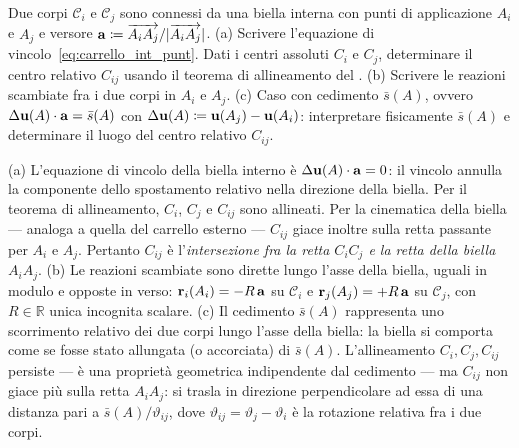 \begin{esercizio}
	\label{ex:C04_pendolo_interno}
	
	Due corpi $\mathcal{C}_i$ e $\mathcal{C}_j$ sono connessi da una biella interna con punti di applicazione $A_i$ e $A_j$ e versore $\mathbf{a} \coloneqq \overrightarrow{A_iA_j}/|\overrightarrow{A_iA_j}|$.
	(a) Scrivere l'equazione di vincolo~\eqref{eq:carrello_int_punt}. Dati i centri assoluti $C_i$ e $C_j$, determinare il centro relativo $C_{ij}$ usando il teorema di allineamento del .
	(b) Scrivere le reazioni scambiate fra i due corpi in $A_i$ e $A_j$.
	(c) Caso con cedimento $\bar{s}(A)$, ovvero $\Delta\mathbf{u}(A)\cdot\mathbf{a} = \bar{s}(A)$ con $\Delta\mathbf{u}(A) \coloneqq \mathbf{u}(A_j) - \mathbf{u}(A_i)$: interpretare fisicamente $\bar{s}(A)$ e determinare il luogo del centro relativo $C_{ij}$.
	
	\risultato (a) L'equazione di vincolo della biella interno è $\Delta\mathbf{u}(A)\cdot\mathbf{a} = 0$: il vincolo annulla la componente dello spostamento relativo nella direzione della biella. Per il teorema di allineamento, $C_i$, $C_j$ e $C_{ij}$ sono allineati. Per la cinematica della biella --- analoga a quella del carrello esterno --- $C_{ij}$ giace inoltre sulla retta passante per $A_i$ e $A_j$. Pertanto $C_{ij}$ è l'\textit{intersezione fra la retta $C_iC_j$ e la retta della biella} $A_iA_j$. (b) Le reazioni scambiate sono dirette lungo l'asse della biella, uguali in modulo e opposte in verso: $\mathbf{r}_i(A_i) = -R\,\mathbf{a}$ su $\mathcal{C}_i$ e $\mathbf{r}_j(A_j) = +R\,\mathbf{a}$ su $\mathcal{C}_j$, con $R \in \mathbb{R}$ unica incognita scalare. (c) Il cedimento $\bar{s}(A)$ rappresenta uno scorrimento relativo dei due corpi lungo l'asse della biella: la biella si comporta come se fosse stato allungata (o accorciata) di $\bar{s}(A)$. L'allineamento $C_i, C_j, C_{ij}$ persiste --- è una proprietà geometrica indipendente dal cedimento --- ma $C_{ij}$ non giace più sulla retta $A_iA_j$: si trasla in direzione perpendicolare ad essa di una distanza pari a $\bar{s}(A)/\vartheta_{ij}$, dove $\vartheta_{ij} = \vartheta_j - \vartheta_i$ è la rotazione relativa fra i due corpi.
	
\end{esercizio}

